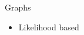 \begin{frame}{Graphs}
\begin{itemize}
    \item Likelihood based
\cite{Yeang2004}
\end{itemize}
\end{frame}

